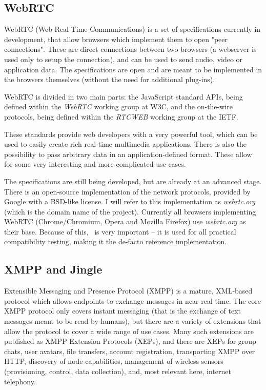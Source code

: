 \documentclass[twoside,openright,a4paper,12pt,english]{article}
\begin{document}
\subsection{WebRTC}
WebRTC (Web Real-Time Communications) is a set of specifications 
currently in development, that allow browsers which implement them to open
"peer connections". These are direct connections between two
browsers (a webserver is used only to setup the connection), and can be used to
send audio, video or application data. The specifications are open and are meant
to be implemented in the browsers themselves (without the need for additional
plug-ins).

WebRTC is divided in two main parts: the JavaScript standard APIs, being defined within
the \emph{WebRTC} working group\cite{webrtc-wg} at W3C,
and the on-the-wire protocols, being defined within
the \emph{RTCWEB} working group\cite{rtcweb-wg} at the IETF.

These standards provide web developers with a very powerful tool, which
can be used to easily create rich real-time multimedia applications.
There is also the possibility to pass arbitrary data in an 
application-defined format. These allow for some very interesting and more
complicated use-cases. 

The specifications are still being developed, but are already at an advanced stage. There is
an open-source implementation of the network protocols, provided by Google with
a BSD-like license. I will refer to this implementation as \emph{webrtc.org}
(which is the domain name of the project). Currently all browsers implementing
WebRTC (Chrome/Chromium, Opera and Mozilla Firefox) 
use \emph{webrtc.org} as their base. Because of this, \wrtc\ is very important -- it is
used for all practical compatibility testing, making it the de-facto reference implementation.




\subsection{XMPP and Jingle}
Extensible Messaging and Presence Protocol (XMPP)\cite{rfc6120} is a mature,
XML-based protocol which allows endpoints
to exchange messages in near real-time. The core XMPP protocol only covers instant messaging (that is the exchange of
text messages meant to be read by humans), but there are a variety of extensions that allow the protocol
to cover a wide range of use cases. Many such extensions are published as XMPP Extension Protocols (XEPs), and there are XEPs for
group chats, user avatars, file transfers, account registration, transporting
XMPP over HTTP, discovery of node capabilities, management of  wireless sensors (provisioning, control, data collection),
and, most relevant here, internet telephony.
\end{document}
